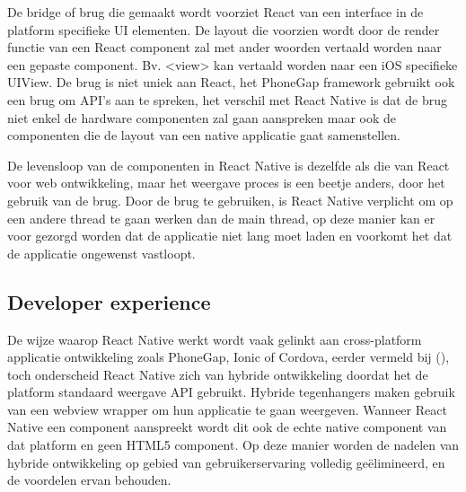 De bridge of brug die gemaakt wordt voorziet React van een interface in de platform specifieke UI elementen. De layout die voorzien wordt door de render functie van een React component zal met ander woorden vertaald worden naar een gepaste component. Bv. <view> kan vertaald worden naar een iOS specifieke UIView. De brug is niet uniek aan React, het PhoneGap framework gebruikt ook een brug om API’s aan te spreken, het verschil met React Native is dat de brug niet enkel de hardware componenten zal gaan aanspreken maar ook de componenten die de layout van een native applicatie gaat samenstellen.

De levensloop van de componenten in React Native is dezelfde als die van React voor web ontwikkeling, maar het weergave proces is een beetje anders, door het gebruik van de brug. Door de brug te gebruiken, is React Native verplicht om op een andere thread te gaan werken dan de main thread, op deze manier kan er voor gezorgd worden dat de applicatie niet lang moet laden en voorkomt het dat de applicatie ongewenst vastloopt.

\subsection{Developer experience}

De wijze waarop React Native werkt wordt vaak gelinkt aan cross-platform applicatie ontwikkeling zoals PhoneGap, Ionic of Cordova, eerder vermeld bij (), toch onderscheid React Native zich van hybride ontwikkeling doordat het de platform standaard weergave API gebruikt. Hybride tegenhangers maken gebruik van een webview wrapper om hun applicatie te gaan weergeven. Wanneer React Native een component aanspreekt wordt dit ook de echte native component van dat platform en geen HTML5 component. Op deze manier worden de nadelen van hybride ontwikkeling op gebied van gebruikerservaring volledig geëlimineerd, en de voordelen ervan behouden. 

